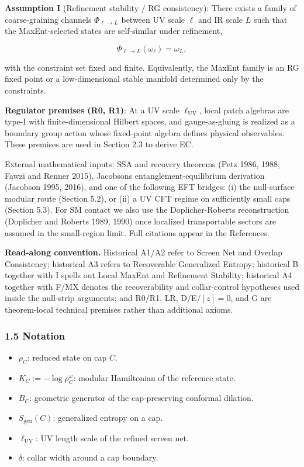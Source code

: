 \textbf{Assumption I} (Refinement stability / RG consistency): There exists a family of coarse-graining channels \(\Phi_{\ell\to L}\) between UV scale \(\ell\) and IR scale \(L\) such that the MaxEnt-selected states are self-similar under refinement,

\[
\Phi_{\ell\to L}(\omega_{\ell}) = \omega_{L},
\]

with the constraint set fixed and finite. Equivalently, the MaxEnt family is an RG fixed point or a low-dimensional stable manifold determined only by the constraints.

\textbf{Regulator premises (R0, R1)}: At a UV scale \(\ell_{\mathrm{UV}}\), local patch algebras are type-I with finite-dimensional Hilbert spaces, and gauge-as-gluing is realized as a boundary group action whose fixed-point algebra defines physical observables. These premises are used in Section 2.3 to derive EC.

External mathematical inputs: SSA and recovery theorems (Petz 1986, 1988; Fawzi and Renner 2015), Jacobson\textquotesingle s entanglement-equilibrium derivation (Jacobson 1995, 2016), and one of the following EFT bridges: (i) the null-surface modular route (Section 5.2), or (ii) a UV CFT regime on sufficiently small caps (Section 5.3). For SM contact we also use the Doplicher-Roberts reconstruction (Doplicher and Roberts 1989, 1990) once localized transportable sectors are assumed in the small-region limit. Full citations appear in the References.

\textbf{Read-along convention.} Historical A1/A2 refer to Screen Net and Overlap Consistency; historical A3 refers to Recoverable Generalized Entropy; historical B together with I spells out Local MaxEnt and Refinement Stability; historical A4 together with F/MX denotes the recoverability and collar-control hypotheses used inside the null-strip arguments; and R0/R1, LR, D/E/\([z]=0\), and G are theorem-local technical premises rather than additional axioms.

\subsubsection{1.5 Notation}\label{15-notation}

\begin{itemize}
\tightlist
\item
  \(\rho_C\): reduced state on cap \(C\).
\item
  \(K_C := -\log \rho_C^{\omega}\): modular Hamiltonian of the reference state.
\item
  \(B_C\): geometric generator of the cap-preserving conformal dilation.
\item
  \(S_{\mathrm{gen}}(C)\): generalized entropy on a cap.
\item
  \(\ell_{\mathrm{UV}}\): UV length scale of the refined screen net.
\item
  \(\delta\): collar width around a cap boundary.
\end{itemize}

